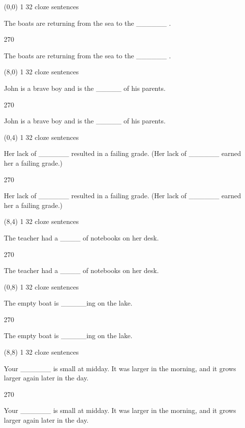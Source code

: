 \documentclass[a4paper]{article}
\newenvironment{itemize*}%
{\begin{itemize}%
 \setlength{\itemsep}{0.5cm}%
 \setlength{\parsep}{0pt}%
 \setlength{\parskip}{0pt}}%
{\end{itemize}}
\newcommand{\mycard}[3]{%
	\small #1 #2
	\par
	\parbox[t][6.8cm][c]{9.5cm}{%
	\par
	\myleft{#3}
	\par
	\myright{#3}
	}
}
\newcommand{\myleft}[1]{%
	\begin{sideways}
	\hspace*{-0.9cm}
		\parbox[t][2.7cm][t]{6.5cm}{%
		\large #1
		}
	\end{sideways}
}
\newcommand{\myright}[1]{%
	\hspace*{6.5cm}
	\begin{turn}{270}
	\hspace*{-7.1cm}
		\parbox[t][2.7cm][t]{6.5cm}{%
		\large #1
		}
	\end{turn}
}
\begin{document}
\begin{textblock}{8}(0,0)
\mycard{1}{32 cloze sentences}{
\begin{itemize*}
\item The boats are returning from the sea to the \_\_\_\_\_\_ .
\end{itemize*}
}
\end{textblock}

\begin{textblock}{8}(8,0)
\mycard{1}{32 cloze sentences}{
\begin{itemize*}
\item John is a brave boy and is the \_\_\_\_\_ of his parents.
\end{itemize*}
}
\end{textblock}

\begin{textblock}{8}(0,4)
\mycard{1}{32 cloze sentences}{
\begin{itemize*}
\item Her lack of \_\_\_\_\_\_ resulted in a failing grade. (Her lack of \_\_\_\_\_\_ earned her a failing grade.)
\end{itemize*}
}
\end{textblock}

\begin{textblock}{8}(8,4)
\mycard{1}{32 cloze sentences}{
\begin{itemize*}
\item The teacher had a \_\_\_\_ of notebooks on her desk.
\end{itemize*}
}
\end{textblock}

\begin{textblock}{8}(0,8)
\mycard{1}{32 cloze sentences}{
\begin{itemize*}
\item The empty boat is \_\_\_\_\_ing on the lake.
\end{itemize*}
}
\end{textblock}

\begin{textblock}{8}(8,8)
\mycard{1}{32 cloze sentences}{
\begin{itemize*}
\item Your \_\_\_\_\_\_ is small at midday. It was larger in the morning, and it grows larger again later in the day.
\end{itemize*}
}
\end{textblock}
\end{document}
